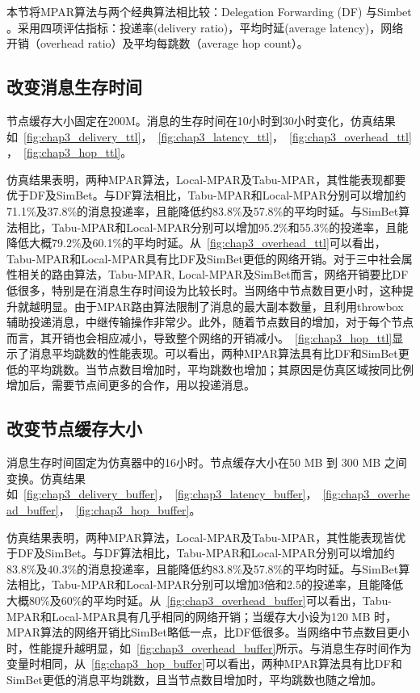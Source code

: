本节将MPAR算法与两个经典算法相比较：Delegation Forwarding (DF) 与Simbet 。采用四项评估指标：投递率(delivery ratio)，平均时延(average latency)，网络开销（overhead ratio）及平均每跳数（average hop count）。



\subsection{改变消息生存时间}

节点缓存大小固定在200M。消息的生存时间在10小时到30小时变化，仿真结果如\figurename~\ref{fig:chap3_delivery_ttl}，\figurename~\ref{fig:chap3_latency_ttl}，\figurename~\ref{fig:chap3_overhead_ttl}，\figurename~\ref{fig:chap3_hop_ttl}。

仿真结果表明，两种MPAR算法，Local-MPAR及Tabu-MPAR，其性能表现都要优于DF及SimBet。与DF算法相比，Tabu-MPAR和Local-MPAR分别可以增加约71.1\%及37.8\%的消息投递率，且能降低约83.8\%及57.8\%的平均时延。与SimBet算法相比，Tabu-MPAR和Local-MPAR分别可以增加95.2\%和55.3\%的投递率，且能降低大概79.2\%及60.1\%的平均时延。从\figurename~\ref{fig:chap3_overhead_ttl}可以看出，Tabu-MPAR和Local-MPAR具有比DF及SimBet更低的网络开销。对于三中社会属性相关的路由算法，Tabu-MPAR, Local-MPAR及SimBet而言，网络开销要比DF低很多，特别是在消息生存时间设为比较长时。当网络中节点数目更小时，这种提升就越明显。由于MPAR路由算法限制了消息的最大副本数量，且利用throwbox辅助投递消息，中继传输操作非常少。此外，随着节点数目的增加，对于每个节点而言，其开销也会相应减小，导致整个网络的开销减小。\figurename~\ref{fig:chap3_hop_ttl}显示了消息平均跳数的性能表现。可以看出，两种MPAR算法具有比DF和SimBet更低的平均跳数。当节点数目增加时，平均跳数也增加；其原因是仿真区域按同比例增加后，需要节点间更多的合作，用以投递消息。



\subsection{改变节点缓存大小}

消息生存时间固定为仿真器中的16小时。节点缓存大小在50 MB 到 300 MB 之间变换。仿真结果如\figurename~\ref{fig:chap3_delivery_buffer}，\figurename~\ref{fig:chap3_latency_buffer}，\figurename~\ref{fig:chap3_overhead_buffer}，\figurename~\ref{fig:chap3_hop_buffer}。

仿真结果表明，两种MPAR算法，Local-MPAR及Tabu-MPAR，其性能表现皆优于DF及SimBet。与DF算法相比，Tabu-MPAR和Local-MPAR分别可以增加约83.8\%及40.3\%的消息投递率，且能降低约83.8\%及57.8\%的平均时延。与SimBet算法相比，Tabu-MPAR和Local-MPAR分别可以增加3倍和2.5的投递率，且能降低大概80\%及60\%的平均时延。从\figurename~\ref{fig:chap3_overhead_buffer}可以看出，Tabu-MPAR和Local-MPAR具有几乎相同的网络开销；当缓存大小设为120 MB 时，MPAR算法的网络开销比SimBet略低一点，比DF低很多。当网络中节点数目更小时，性能提升越明显，如\figurename~\ref{fig:chap3_overhead_buffer}所示。与消息生存时间作为变量时相同，从\figurename~\ref{fig:chap3_hop_buffer}可以看出，两种MPAR算法具有比DF和SimBet更低的消息平均跳数，且当节点数目增加时，平均跳数也随之增加。


